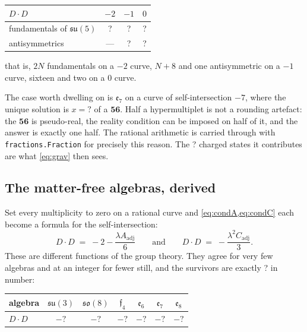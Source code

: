 \documentclass[11pt,a4paper]{article}
\newcommand{\SFMatterFreeCount}{?}\newcommand{\SFMatterFreeList}{?}
\newcommand{\SFSUFiveMinusOneFund}{?}\newcommand{\SFSUFiveMinusOneAnti}{?}
\newcommand{\SFSUFiveMinusTwoFund}{?}\newcommand{\SFSUFiveZeroFund}{?}
\newcommand{\SFSUFiveZeroAnti}{?}\newcommand{\SFESevenHalf}{?}
\newcommand{\SFESevenCharged}{?}\newcommand{\SFSOTenSpinorDim}{?}
\newcommand{\SFMFsuThree}{?}\newcommand{\SFMFsoEight}{?}
\newcommand{\SFMFfFour}{?}\newcommand{\SFMFeSix}{?}
\newcommand{\SFMFeSeven}{?}\newcommand{\SFMFeEight}{?}
\newcommand{\g}[1]{\mathfrak{#1}}
\theoremstyle{definition}
\begin{document}
\begin{center}
\begin{tabular}{lccc}
\toprule
$D\cdot D$ & $-2$ & $-1$ & $0$ \\
\midrule
fundamentals of $\g{su}(5)$
& \SFSUFiveMinusTwoFund & \SFSUFiveMinusOneFund & \SFSUFiveZeroFund \\
antisymmetrics
& --- & \SFSUFiveMinusOneAnti & \SFSUFiveZeroAnti \\
\bottomrule
\end{tabular}
\end{center}

\noindent
that is, $2N$ fundamentals on a $-2$ curve, $N+8$ and one antisymmetric on a
$-1$ curve, sixteen and two on a $0$ curve.

The case worth dwelling on is $\g{e}_7$ on a curve of self-intersection $-7$,
where the unique solution is $x = \SFESevenHalf$ of a $\mathbf{56}$. Half a
hypermultiplet is not a rounding artefact: the $\mathbf{56}$ is pseudo-real,
the reality condition can be imposed on half of it, and the answer is exactly
one half. The rational arithmetic is carried through with
\texttt{fractions.Fraction} for precisely this reason. The
\SFESevenCharged{} charged states it contributes are what
\cref{eq:grav} then sees.

\subsection{The matter-free algebras, derived}
\label{sec:matterfree}

Set every multiplicity to zero on a rational curve and
\cref{eq:condA,eq:condC} each become a formula for the self-intersection:
%
\begin{equation}
D \cdot D \;=\; -2 - \frac{\lambda A_{\mathrm{adj}}}{6}
\qquad\text{and}\qquad
D \cdot D \;=\; -\frac{\lambda^2 C_{\mathrm{adj}}}{3} .
\label{eq:matterfree}
\end{equation}
%
These are different functions of the group theory. They agree for very few
algebras and at an integer for fewer still, and the survivors are exactly
\SFMatterFreeCount{} in number:

\begin{center}
\begin{tabular}{lcccccc}
\toprule
algebra & $\g{su}(3)$ & $\g{so}(8)$ & $\g{f}_4$ & $\g{e}_6$ & $\g{e}_7$
& $\g{e}_8$ \\
\midrule
$D\cdot D$ & $-\SFMFsuThree$ & $-\SFMFsoEight$ & $-\SFMFfFour$
& $-\SFMFeSix$ & $-\SFMFeSeven$ & $-\SFMFeEight$ \\
\bottomrule
\end{tabular}
\end{center}
\end{document}
